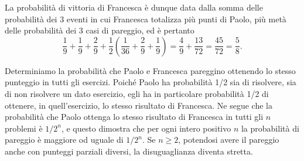 {La probabilità di vittoria di Francesca è dunque data dalla somma delle probabilità dei 3 eventi in cui Francesca totalizza più punti di Paolo, più metà delle probabilità dei 3 casi di pareggio, ed è pertanto
$$\frac{1}{9}+\frac{1}{9}+\frac{2}{9}+
\frac{1}{2}\left(\frac{1}{36}+\frac{2}{9}+\frac{1}{9}\right)=
\frac{4}{9}+\frac{13}{72}=\frac{45}{72}=\frac{5}{8}.$$

\DomandaC Determiniamo la probabilità che Paolo e Francesca
pareggino ottenendo lo stesso punteggio in tutti gli esercizi. Poiché Paolo ha probabilità 1/2 sia di risolvere, sia di non risolvere un dato esercizio, egli ha in particolare probabilità 1/2 di ottenere, in quell'esercizio, lo stesso risultato di Francesca. Ne segue che la probabilità che Paolo ottenga lo stesso risultato di Francesca in tutti gli $n$ problemi è $1/2^{n}$, e questo dimostra che per ogni intero positivo $n$ la probabilità di pareggio è maggiore od uguale di $1/2^{n}$.  Se $n\geq 2$, potendosi avere il pareggio anche con punteggi parziali diversi, la
disuguaglianza diventa stretta.}

\renewcommand{\SoluzioniAlternative}{\TitoloSoluzioneAlternativaA La 
probabilità che Paolo risolva $k$ esercizi su $n$ è
$$\binom{n}{k}\frac{1}{2^{n}},$$
la probabilità che Francesca risolva $k$ esercizi su $n$ è
$$\binom{n}{k}\left(\frac{2}{3}\right)^{k}\frac{1}{3^{n-k}}=
\binom{n}{k}\frac{2^{k}}{3^{n}}.$$

La giustificazione di tali formule è piuttosto classica: per Francesca, per esempio, il binomiale rappresenta i modi di scegliere $k$ esercizi da risolvere su $n$, il fattore $(2/3)^{k}$ rappresenta la sua probabilità di risolvere $k$ esercizi fissati e $(1/3)^{n-k}$ la sua probabilità di non risolvere i rimanenti $n-k$.

Ne segue che la probabilità di pareggio è data da
$$\sum_{k=0}^{n}\binom{n}{k}^{2}\frac{1}{2^{n}}\cdot\frac{2^{k}}{3^{n}}=
\frac{1}{6^{n}}\sum_{k=0}^{n}\binom{n}{k}^{2}2^{k}.$$

Possiamo ora maggiorare la sommatoria togliendo il quadrato ai coefficienti binomiali e notando che per $n\geq 2$ la maggiorazione è stretta in quanto almeno uno dei coefficienti binomiali è strettamente maggiore di 1. Dalla formula del binomio di Newton otteniamo quindi che
$$\frac{1}{6^{n}}\sum_{k=0}^{n}\binom{n}{k}^{2}2^{k}>
\frac{1}{6^{n}}\sum_{k=0}^{n}\binom{n}{k}2^{k}\cdot 1^{n-k}=
\frac{1}{6^{n}}(2+1)^{n}=\frac{1}{2^{n}},$$
che è il risultato cercato.}

\renewcommand{\Osservazioni}{\TitoloOsservazione Nel linguaggio della 
teoria della probabilità, le prime due formule della soluzione alternativa dicono semplicemente che la somma di $n$ variabili aleatorie di Bernoulli indipendenti è una variabile aleatoria binomiale.
}

\renewcommand{\Commenti}{
}